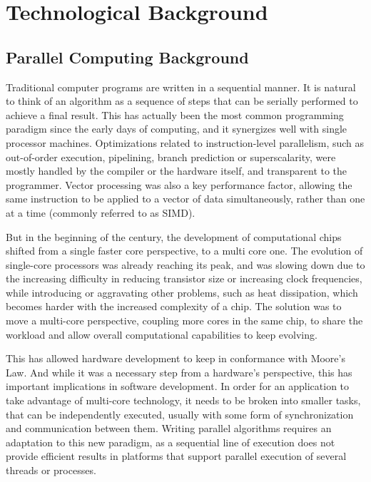 \documentclass[main.tex]{subfiles}
\begin{document}
\chapter{Technological Background} \label{chapter:back}


\section{Parallel Computing Background}

Traditional computer programs are written in a sequential manner. It is natural to think of an algorithm as a sequence of steps that can be serially performed to achieve a final result. This has actually been the most common programming paradigm since the early days of computing, and it synergizes well with single processor machines. Optimizations related to instruction-level parallelism, such as out-of-order execution, pipelining, branch prediction or superscalarity, were mostly handled by the compiler or the hardware itself, and transparent to the programmer. Vector processing was also a key performance factor, allowing the same instruction to be applied to a vector of data simultaneously, rather than one at a time (commonly referred to as \ac{SIMD}).

But in the beginning of the  century, the development of computational chips shifted from a single faster core perspective, to a multi core one. The evolution of single-core processors was already reaching its peak, and was slowing down due to the increasing difficulty in reducing transistor size or increasing clock frequencies, while introducing or aggravating other problems, such as heat dissipation, which becomes harder with the increased complexity of a chip. The solution was to move a multi-core perspective, coupling more cores in the same chip, to share the workload and allow overall computational capabilities to keep evolving.

This has allowed hardware development to keep in conformance with Moore's Law. And while it was a necessary step from a hardware's perspective, this has important implications in software development. In order for an application to take advantage of multi-core technology, it needs to be broken into smaller tasks, that can be independently executed, usually with some form of synchronization and communication between them. Writing parallel algorithms requires an adaptation to this new paradigm, as a sequential line of execution does not provide efficient results in platforms that support parallel execution of several threads or processes.
\end{document}

